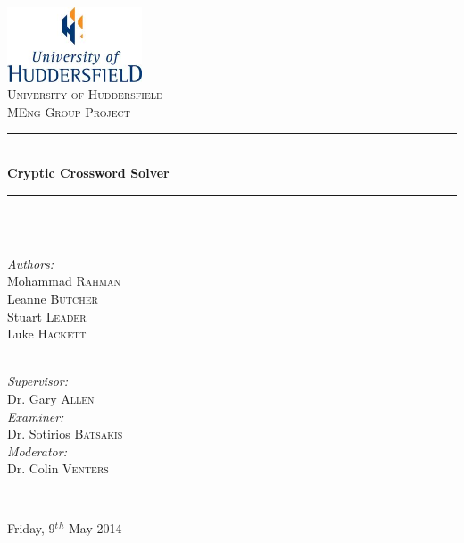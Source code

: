 \newcommand{\HRule}{\rule{\linewidth}{0.5mm}}

\begin{titlepage}
  \begin{center}

  \includegraphics[width=0.3\textwidth]{./UoHLogo.jpg}~\\[2.5cm]

  \textsc{\LARGE University of Huddersfield}\\[1.5cm]

  \textsc{\Large MEng Group Project}\\[0.75cm]

  \HRule \\[0.4cm]
    { \huge \bfseries Cryptic Crossword Solver }
  \\[0.1cm]

  \HRule \\[2cm]

  \begin{minipage}{0.4\textwidth}
    \begin{flushleft} \large  ~\\
      \emph{Authors:}          \\[0.5ex]
      Mohammad \textsc{Rahman} \\[0.5ex]
      Leanne \textsc{Butcher}  \\[0.5ex]
      Stuart \textsc{Leader}   \\[0.5ex]
      Luke \textsc{Hackett} 
    \end{flushleft}
  \end{minipage}
  \begin{minipage}{0.4\textwidth}
    \begin{flushright} \large ~\\
      \emph{Supervisor:} \\ 
      Dr. Gary \textsc{Allen}
      ~\\[1ex]
      \emph{Examiner:} \\
      Dr. Sotirios \textsc{Batsakis}
      ~\\[1ex]
      \emph{Moderator:} \\
      Dr. Colin \textsc{Venters} 
    \end{flushright}
  \end{minipage}
  ~\\[0.01cm]


  \vfill

  {\large Friday, 9$^t$$^h$ May 2014}

  \end{center}
\end{titlepage}
